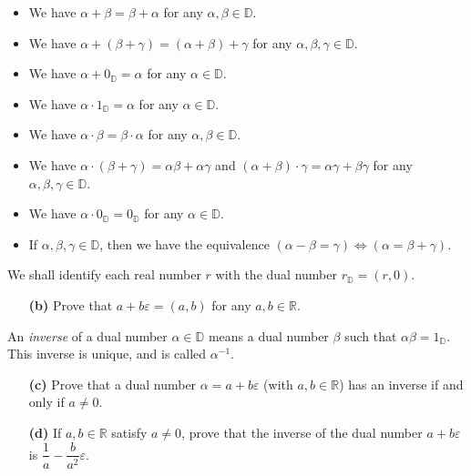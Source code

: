 \documentclass[paper=a4, fontsize=12pt]{scrartcl}%
\theoremstyle{plainsl}
\theoremstyle{definition}
\theoremstyle{remark}
\begin{document}
\begin{itemize}
\item We have $\alpha+ \beta= \beta+ \alpha$ for any $\alpha, \beta
\in{\mathbb{D}}$.

\item We have $\alpha+ \left(  \beta+ \gamma\right)  = \left(  \alpha+
\beta\right)  + \gamma$ for any $\alpha, \beta, \gamma\in{\mathbb{D}}$.

\item We have $\alpha+ 0_{\mathbb{D}} = \alpha$ for any $\alpha\in{\mathbb{D}%
}$.

\item We have $\alpha\cdot1_{\mathbb{D}} = \alpha$ for any $\alpha
\in{\mathbb{D}}$.

\item We have $\alpha\cdot\beta= \beta\cdot\alpha$ for any $\alpha, \beta
\in{\mathbb{D}}$.

\item We have $\alpha\cdot\left(  \beta+ \gamma\right)  = \alpha\beta+
\alpha\gamma$ and $\left(  \alpha+ \beta\right)  \cdot\gamma= \alpha\gamma+
\beta\gamma$ for any $\alpha, \beta, \gamma\in{\mathbb{D}}$.

\item We have $\alpha\cdot0_{\mathbb{D}} = 0_{\mathbb{D}}$ for any $\alpha
\in{\mathbb{D}}$.

\item If $\alpha, \beta, \gamma\in{\mathbb{D}}$, then we have the equivalence
$\left(  \alpha- \beta= \gamma\right)  \iff\left(  \alpha= \beta+
\gamma\right)  $.
\end{itemize}

We shall identify each real number $r$ with the dual number $r_{\mathbb{D}} =
\left(  r, 0 \right)  $.

\begin{enumerate}
\item[\textbf{(b)}] Prove that $a + b\varepsilon= \left(  a, b \right)  $ for
any $a, b \in\mathbb{R}$.
\end{enumerate}

An \textit{inverse} of a dual number $\alpha\in{\mathbb{D}}$ means a dual
number $\beta$ such that $\alpha\beta= 1_{\mathbb{D}}$. This inverse is
unique, and is called $\alpha^{-1}$.

\begin{enumerate}
\item[\textbf{(c)}] Prove that a dual number $\alpha= a + b\varepsilon$ (with
$a, b \in\mathbb{R}$) has an inverse if and only if $a \neq0$.

\item[\textbf{(d)}] If $a, b \in\mathbb{R}$ satisfy $a \neq0$, prove that the
inverse of the dual number $a + b\varepsilon$ is $\dfrac{1}{a} - \dfrac
{b}{a^{2}} \varepsilon$.
\end{enumerate}
\end{document}

